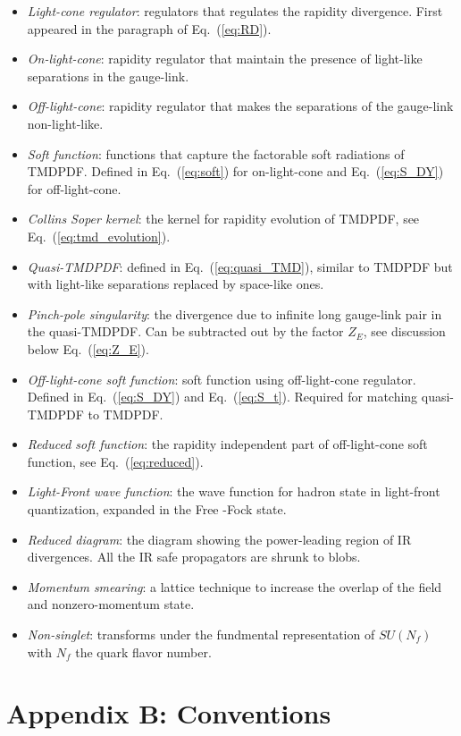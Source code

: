 \documentclass[aps,rmp,reprint,amsmath,amssymb,graphicx,longbibliography]{revtex4-1} %
\begin{document}
\begin{itemize}
\item[] {\it Light-cone regulator}: regulators that regulates the rapidity divergence. First appeared in the paragraph of Eq.~(\ref{eq:RD}).
\item[] {\it On-light-cone}: rapidity regulator that maintain the presence of light-like separations in the gauge-link.
\item[] {\it Off-light-cone}: rapidity regulator that makes the separations of the gauge-link non-light-like.
\item[] {\it Soft function}:  functions that capture the factorable soft radiations of TMDPDF. Defined in Eq.~(\ref{eq:soft}) for on-light-cone and Eq.~(\ref{eq:S_DY}) for off-light-cone.
\item[] {\it Collins Soper kernel}: the kernel for rapidity evolution of TMDPDF, see Eq.~(\ref{eq:tmd_evolution}).
\item[] {\it Quasi-TMDPDF}: defined in Eq.~(\ref{eq:quasi_TMD}), similar to TMDPDF but with light-like separations replaced by space-like ones.
\item[] {\it Pinch-pole singularity}: the divergence due to infinite long gauge-link pair in the quasi-TMDPDF. Can be subtracted out by the factor $Z_E$, see discussion below Eq.~(\ref{eq:Z_E}).
\item[] {\it Off-light-cone soft function}: soft function using off-light-cone regulator. Defined in Eq.~(\ref{eq:S_DY}) and Eq.~(\ref{eq:S_t}). Required for matching quasi-TMDPDF to TMDPDF.
\item[] {\it Reduced soft function}: the rapidity independent part of off-light-cone soft function, see Eq.~(\ref{eq:reduced}).
\item[] {\it Light-Front wave function}: the wave function for hadron state in light-front quantization, expanded in the Free -Fock state.
\item[] {\it Reduced diagram}: the diagram showing the power-leading region of IR divergences. All the IR safe propagators are shrunk to blobs.
\item[] {\it Momentum smearing}: a lattice technique to increase the overlap of the field and nonzero-momentum state.
\item[] {\it Non-singlet}: transforms under the fundmental representation of $SU(N_f)$ with $N_f$ the quark flavor number.
\end{itemize}

\section*{Appendix B: Conventions}
\label{sec:notation}
\end{document}
